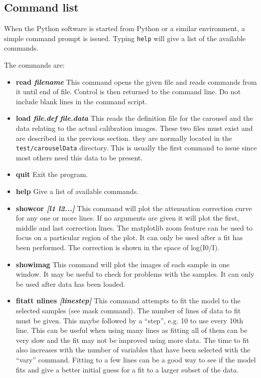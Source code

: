 \documentclass[a4paper,12pt]{article}
\begin{document}
\subsection{Command list}

When the Python software is started from Python or a similar environment, a simple command prompt is issued.
Typing \texttt{help} will give a list of the available commands.

The commands are:
\begin{itemize}
\item{\bf read \it{filename}} This command opens the given file and reads commands from it until end of file.
Control is then returned to the command line. Do not include blank lines in the command script.

\item{\bf load \it{file.def} \it{file.data}} This reads the definition file for the carousel and the data
relating to the actual calibration images. These two files must exist and are described in the previous section.
they are normally located in the \texttt{test/carouselData} directory.
This is usually the first command to issue since most others need this data to be present.

\item{\bf quit} Exit the program.

\item{\bf help} Give a list of available commands.

\item{\bf showcor \it{[l1 l2...]}} This command will plot the attenuation correction curve for any one or more lines. If no arguments are given
it will plot the first, middle and last correction lines. The matplotlib zoom feature can be used to focus on a particular region of the
plot. It can only be used after a fit has been performed.
The correction is shown in the space of log(I0/I).

\item{\bf showimag} This command will plot the images of each sample in one window. It may be useful to check for problems with the samples.
It can only be used after data has been loaded.

\item{\bf fitatt nlines \it{[linestep]}} This command attempts to fit the model to the selected samples (see mask command). The
number of lines of data to fit must be given. This maybe followed by a ``step'', e.g. 10 to use every 10th line.
This can be useful when using many lines as fitting all of them can be very slow and the
fit may not be improved using more data.
The time to fit also increases with the number of variables that have been selected with the ``vary'' command.
Fitting to a few lines can be a good way to see if the model fits and give a better initial guess for a fit
to a larger subset of the data.



\end{itemize}
\end{document}
